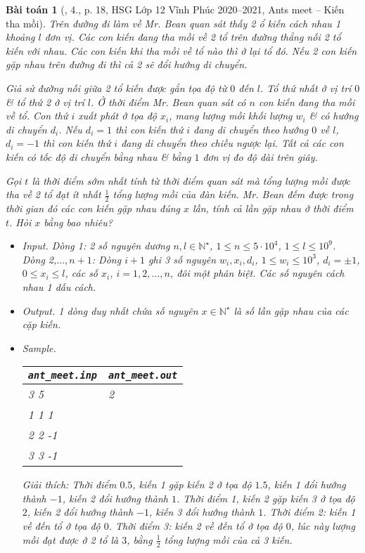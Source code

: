 \documentclass{article}
\newtheorem{baitoan}{Bài toán}
\begin{document}
\begin{baitoan}[\cite{Trung_HSG_THPT_Tin}, 4., p. 18, HSG Lớp 12 Vĩnh Phúc 2020--2021, Ants meet -- Kiến tha mồi]
	Trên đường đi làm về Mr. Bean quan sát thấy 2 ổ kiến cách nhau 1 khoảng $l$ đơn vị. Các con kiến đang tha mồi về 2 tổ trên đường thẳng nối 2 tổ kiến với nhau. Các con kiến khi tha mồi về tổ nào thì ở lại tổ đó. Nếu 2 con kiến gặp nhau trên đường đi thì cả 2 sẽ đổi hướng di chuyển.
	
	Giả sử đường nối giữa 2 tổ kiến được gắn tọa độ từ $0$ đến $l$. Tổ thứ nhất ở vị trí $0$ \& tổ thứ 2 ở vị trí $l$. Ở thời điểm Mr. Bean quan sát có $n$ con kiến đang tha mồi về tổ. Con thứ $i$ xuất phát ở tọa độ $x_i$, mang lượng mồi khối lượng $w_i$ \& có hướng di chuyển $d_i$. Nếu $d_i = 1$ thì con kiến thứ $i$ đang di chuyển theo hướng $0$ về $l$, $d_i = -1$ thì con kiến thứ $i$ đang di chuyển theo chiều ngược lại. Tất cả các con kiến có tốc độ di chuyển bằng nhau \& bằng $1$ đơn vị đo độ dài trên giây.
	
	Gọi $t$ là thời điểm sớm nhất tính từ thời điểm quan sát mà tổng lượng mồi được tha về 2 tổ đạt ít nhất $\frac{1}{2}$ tổng lượng mồi của đàn kiến. Mr. Bean đếm được trong thời gian đó các con kiến gặp nhau đúng $x$ lần, tính cả lần gặp nhau ở thời điểm $t$. Hỏi $x$ bằng bao nhiêu?
	\begin{itemize}
		\item {\sf Input.} Dòng 1: 2 số nguyên dương $n,l\in\mathbb{N}^\star$, $1\le n\le5\cdot10^4$, $1\le l\le10^9$. Dòng 2,$\ldots,n + 1$: Dòng $i + 1$ ghi 3 số nguyên $w_i,x_i,d_i$, $1\le w_i\le10^3$, $d_i = \pm1$, $0\le x_i\le l$, các số $x_i$, $i = 1,2,\ldots,n$, đôi một phân biệt. Các số nguyên cách nhau 1 dấu cách.
		\item {\sf Output.} 1 dòng duy nhất chứa số nguyên $x\in\mathbb{N}^\star$ là số lần gặp nhau của các cặp kiến.
		\item {\sf Sample.}
		\begin{table}[H]
			\centering
			\begin{tabular}{|l|l|}
				\hline
				\verb|ant_meet.inp| & \verb|ant_meet.out| \\
				\hline
				3 5 & 2 \\
				1 1 1 & \\
				2 2 -1 & \\
				3 3 -1 & \\
				\hline
			\end{tabular}
		\end{table}
		Giải thích: Thời điểm $0.5$, kiến 1 gặp kiến 2 ở tọa độ $1.5$, kiến 1 đổi hướng thành $-1$, kiến 2 đổi hướng thành $1$. Thời điểm 1, kiến 2 gặp kiến 3 ở tọa độ $2$, kiến 2 đổi hướng thành $-1$, kiến 3 đổi hướng thành $1$. Thời điểm 2: kiến 1 về đến tổ ở tọa độ $0$. Thời điểm 3: kiến 2 về đến tổ ở tọa độ $0$, lúc này lượng mồi đạt được ở 2 tổ là $3$, bằng  $\frac{1}{2}$ tổng lượng mồi của cả 3 kiến.
	\end{itemize}
\end{baitoan}


\printbibliography[heading=bibintoc]
\end{document}
